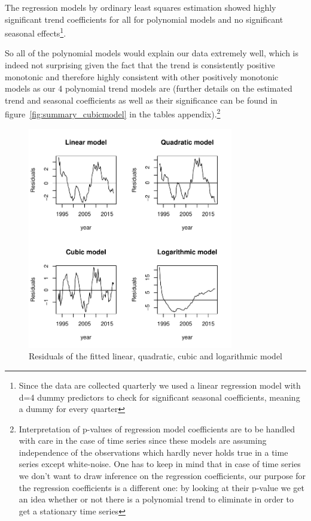 \documentclass[11pt,a4paper]{article}
\begin{document}
The regression models by ordinary least squares estimation \cite[p.~11]{htf09} showed highly significant trend coefficients for all for polynomial models and no significant seasonal effects\footnote{Since the data are collected quarterly we used a linear regression model with d=4 dummy predictors to check for significant seasonal coefficients, meaning a dummy for every quarter}.

So all of the polynomial models would explain our data extremely well, which is indeed not surprising given the fact that the trend is consistently positive monotonic and therefore highly consistent with other positively monotonic models as our 4 polynomial trend models are (further details on the estimated trend and seasonal coefficients as well as their significance can be found in figure~\ref{fig:summary_cubicmodel} in the tables appendix).\footnote{
    Interpretation of p-values of regression model coefficients are to be handled with care in the case of time series since these models are assuming independence of the observations which hardly never holds true in a time series except white-noise.
    One has to keep in mind that in case of time series we don't want to draw inference on the regression coefficients, our purpose for the regression coefficients is a different one: by looking at their p-value we get an idea whether or not there is a polynomial trend to eliminate in order to get a stationary time series
}

\begin{figure}
    \centering
    \includegraphics[angle=0,width=0.8\textwidth]{resid_polynomials}
    \caption{Residuals of the fitted linear, quadratic, cubic and logarithmic model}
    \label{fig:resid_polynomials}
\end{figure}
\end{document}
